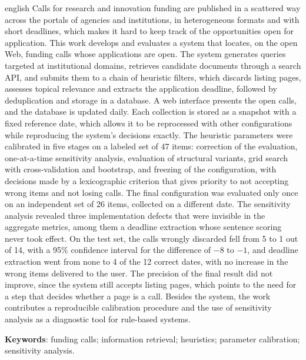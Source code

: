 \begin{resumo}[Abstract]
\begin{otherlanguage*}{english}
Calls for research and innovation funding are published in a scattered way
across the portals of agencies and institutions, in heterogeneous formats and
with short deadlines, which makes it hard to keep track of the opportunities
open for application. This work develops and evaluates a system that locates,
on the open Web, funding calls whose applications are open. The system
generates queries targeted at institutional domains, retrieves candidate
documents through a search API, and submits them to a chain of heuristic
filters, which discards listing pages, assesses topical relevance and extracts
the application deadline, followed by deduplication and storage in a
database. A web interface presents the open calls, and the database is updated
daily. Each collection is stored as a snapshot with a fixed reference date,
which allows it to be reprocessed with other configurations while reproducing
the system's decisions exactly. The heuristic parameters were calibrated in
five stages on a labeled set of 47 items: correction of the evaluation,
one-at-a-time sensitivity analysis, evaluation of structural variants, grid
search with cross-validation and bootstrap, and freezing of the configuration,
with decisions made by a lexicographic criterion that gives priority to not
accepting wrong items and not losing calls. The final configuration was
evaluated only once on an independent set of 26 items, collected on a
different date. The sensitivity analysis revealed three implementation defects
that were invisible in the aggregate metrics, among them a deadline extraction
whose sentence scoring never took effect. On the test set, the calls wrongly
discarded fell from 5 to 1 out of 14, with a 95\% confidence interval for the
difference of $-8$ to $-1$, and deadline extraction went from none to 4 of the
12 correct dates, with no increase in the wrong items delivered to the user.
The precision of the final result did not improve, since the system still
accepts listing pages, which points to the need for a step that decides
whether a page is a call. Besides the system, the work contributes a
reproducible calibration procedure and the use of sensitivity analysis as a
diagnostic tool for rule-based systems.

\vspace{\onelineskip}

\noindent
\textbf{Keywords}: funding calls; information retrieval; heuristics;
parameter calibration; sensitivity analysis.
\end{otherlanguage*}
\end{resumo}

